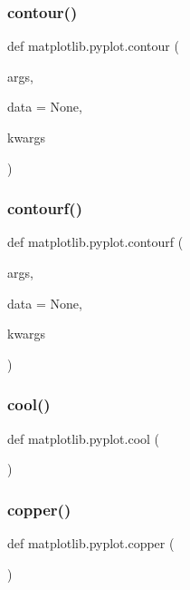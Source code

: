 \subsubsection{\texorpdfstring{contour()}{contour()}}
{\footnotesize\ttfamily def matplotlib.\+pyplot.\+contour (\begin{DoxyParamCaption}\item[{}]{args,  }\item[{}]{data = {\ttfamily None},  }\item[{}]{kwargs }\end{DoxyParamCaption})}

\mbox{\label{namespacematplotlib_1_1pyplot_a8766395d1c09463e985f6ee8fa57269c}} 
\subsubsection{\texorpdfstring{contourf()}{contourf()}}
{\footnotesize\ttfamily def matplotlib.\+pyplot.\+contourf (\begin{DoxyParamCaption}\item[{}]{args,  }\item[{}]{data = {\ttfamily None},  }\item[{}]{kwargs }\end{DoxyParamCaption})}

\mbox{\label{namespacematplotlib_1_1pyplot_a4e418e3fdf80ee35a124c2ca6eb2156f}} 
\subsubsection{\texorpdfstring{cool()}{cool()}}
{\footnotesize\ttfamily def matplotlib.\+pyplot.\+cool (\begin{DoxyParamCaption}{ }\end{DoxyParamCaption})}

\mbox{\label{namespacematplotlib_1_1pyplot_a718785d18680aaa0e7f4f69f59145b4d}} 
\subsubsection{\texorpdfstring{copper()}{copper()}}
{\footnotesize\ttfamily def matplotlib.\+pyplot.\+copper (\begin{DoxyParamCaption}{ }\end{DoxyParamCaption})}

